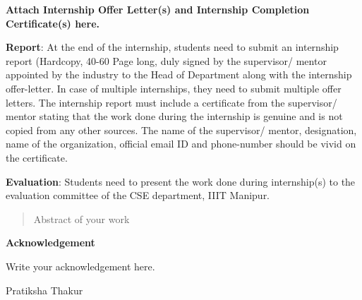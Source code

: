 \documentclass[a4paper, 11pt, oneside]{report}
\begin{document}
	\newpage
\textbf{ Attach Internship Offer Letter(s) and Internship Completion Certificate(s) here.}

        \vspace{1cm}
 \textbf{Report}: At the end of the internship, students need to submit an internship report (Hardcopy, 40-60 Page long, duly signed by the supervisor/
mentor appointed by the industry to the Head of Department along with the internship offer-letter. In case of multiple internships, they need to submit multiple offer letters. The internship report must include a certificate from the supervisor/ mentor stating that the work done during the internship is genuine and is not copied from any other sources. The name of the supervisor/ mentor, designation, name of the organization, official email ID and phone-number should be vivid on the certificate.
   \vspace{1cm}
   
\textbf{Evaluation}: Students need to present the work done during internship(s) to the evaluation committee of the CSE department, IIIT Manipur.
 
		\newpage

\begin{abstract}
	
Abstract of your work

\end{abstract}

\pagebreak
	

        \begin{center}
            { \LARGE \textbf{Acknowledgement}}
        \end{center}
	\vspace{2cm}
	Write your acknowledgement here.
	
	
	\vspace{1cm}
	
	\hspace{7cm}Pratiksha Thakur
	\tableofcontents
	\listoffigures
        \listoftables
	
	
       
        
       
        
      
        
     
        
      
        
        
        
        
        
	
        
	
	
	
	
\end{document}

